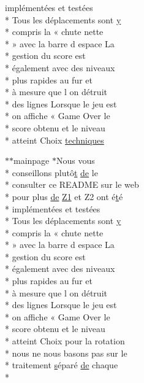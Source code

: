 \begin{DoxyCompactItemize}
implémentées et testées \\*
Tous les déplacements sont \hyperlink{gl_8h_a74d80fd479c0f6d0153c709949a089ef}{y} \\*
compris la « chute nette \\*
» avec la barre d espace La \\*
gestion du score est \\*
également avec des niveaux \\*
plus rapides au fur et \\*
à mesure que l on détruit \\*
des lignes Lorsque le jeu est \\*
on affiche « Game Over le \\*
score obtenu et le niveau \\*
atteint Choix \hyperlink{mainpage_8dox_a9f12eb7600dd7c128907fcfa304cd3a1}{techniques}
\item 
$\ast$$\ast$mainpage $\ast$Nous vous \\*
conseillons plutô\hyperlink{gl_8h_a00140d6f5c548b26daf170bf16e86a6d}{t} \hyperlink{mainpage_8dox_ab37fa35e77d95c6d0d0ab620c97c3db8}{de} le \\*
consulter ce R\-E\-A\-D\-M\-E sur le web \\*
pour plus \hyperlink{mainpage_8dox_ab37fa35e77d95c6d0d0ab620c97c3db8}{de} \hyperlink{mainpage_8dox_ac1b4262bdb6c0693bc375775d6cfa421}{Z1} et Z2 ont é\hyperlink{gl_8h_a00140d6f5c548b26daf170bf16e86a6d}{t}é \\*
implémentées et testées \\*
Tous les déplacements sont \hyperlink{gl_8h_a74d80fd479c0f6d0153c709949a089ef}{y} \\*
compris la « chute nette \\*
» avec la barre d espace La \\*
gestion du score est \\*
également avec des niveaux \\*
plus rapides au fur et \\*
à mesure que l on détruit \\*
des lignes Lorsque le jeu est \\*
on affiche « Game Over le \\*
score obtenu et le niveau \\*
atteint Choix pour la rotation \\*
nous ne nous basons pas sur le \\*
traitement \hyperlink{gl_8h_ad585a1393cfa368fa9dc3d8ebff640d5}{s}éparé \hyperlink{mainpage_8dox_ab37fa35e77d95c6d0d0ab620c97c3db8}{de} chaque \\*
$$
\end{DoxyCompactItemize}
